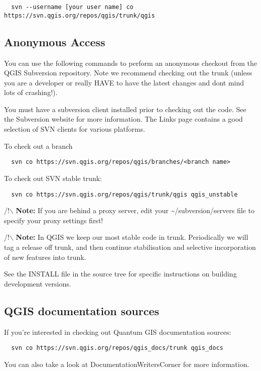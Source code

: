 \begin{verbatim}
  svn --username [your user name] co https://svn.qgis.org/repos/qgis/trunk/qgis
\end{verbatim}

\subsection{Anonymous Access}
You can use the following commands to perform an anonymous checkout from the QGIS Subversion repository. 
Note we recommend checking out the trunk (unless you are a developer or really HAVE to have the latest 
changes and dont mind lots of crashing!).

You must have a subversion client installed prior to checking out the code. See the Subversion website 
for more information. The Links page contains a good selection of SVN clients for various platforms.

To check out a branch

\begin{verbatim}
  svn co https://svn.qgis.org/repos/qgis/branches/<branch name>
\end{verbatim}
To check out SVN stable trunk:

\begin{verbatim}
  svn co https://svn.qgis.org/repos/qgis/trunk/qgis qgis_unstable
\end{verbatim}

/!$\backslash$ \textbf{Note:} If you are behind a proxy server, edit your \~{}/subversion/servers file to specify 
your proxy settings first!

/!$\backslash$ \textbf{Note:} In QGIS we keep our most stable code in trunk. Periodically we will tag a release 
off trunk, and then continue stabilisation and selective incorporation of new features into trunk.

See the INSTALL file in the source tree for specific instructions on building development versions. 

\subsection{QGIS documentation sources}
If you're interested in checking out Quantum GIS documentation sources:

\begin{verbatim}
  svn co https://svn.qgis.org/repos/qgis_docs/trunk qgis_docs
\end{verbatim}

You can also take a look at DocumentationWritersCorner for more information.

